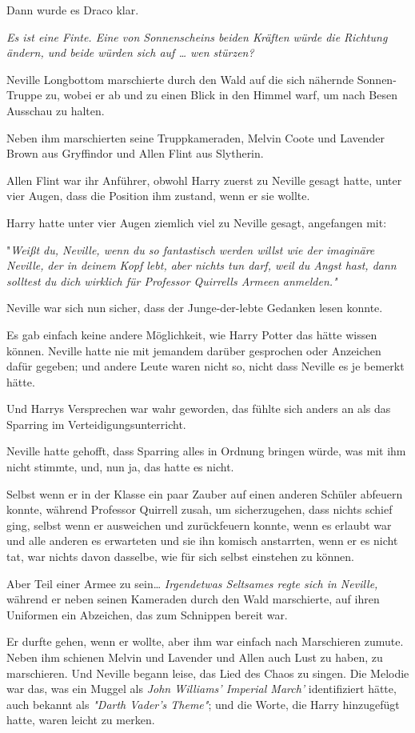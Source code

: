{Dann wurde es Draco klar.

\emph{Es ist eine Finte. Eine von Sonnenscheins beiden Kräften würde die Richtung ändern, und beide würden sich auf … wen stürzen?}

Neville Longbottom marschierte durch den Wald auf die sich nähernde Sonnen-Truppe zu, wobei er ab und zu einen Blick in den Himmel warf, um nach Besen Ausschau zu halten.

Neben ihm marschierten seine Truppkameraden, Melvin Coote und Lavender Brown aus Gryffindor und Allen Flint aus Slytherin.

Allen Flint war ihr Anführer, obwohl Harry zuerst zu Neville gesagt hatte, unter vier Augen, dass die Position ihm zustand, wenn er sie wollte.

Harry hatte unter vier Augen ziemlich viel zu Neville gesagt, angefangen mit:

"\emph{Weißt du, Neville, wenn du so fantastisch werden willst wie der imaginäre Neville,} \emph{der in deinem Kopf lebt, aber nichts tun darf, weil du Angst hast, dann solltest du dich wirklich für Professor Quirrells Armeen anmelden."}

Neville war sich nun sicher, dass der Junge-der-lebte Gedanken lesen konnte.

Es gab einfach keine andere Möglichkeit, wie Harry Potter das hätte wissen können. Neville hatte nie mit jemandem darüber gesprochen oder Anzeichen dafür gegeben; und andere Leute waren nicht so, nicht dass Neville es je bemerkt hätte.

Und Harrys Versprechen war wahr geworden, das fühlte sich anders an als das Sparring im Verteidigungsunterricht.

Neville hatte gehofft, dass Sparring alles in Ordnung bringen würde, was mit ihm nicht stimmte, und, nun ja, das hatte es nicht.

Selbst wenn er in der Klasse ein paar Zauber auf einen anderen Schüler abfeuern konnte, während Professor Quirrell zusah, um sicherzugehen, dass nichts schief ging, selbst wenn er ausweichen und zurückfeuern konnte, wenn es erlaubt war und alle anderen es erwarteten und sie ihn komisch anstarrten, wenn er es nicht tat, war nichts davon dasselbe, wie für sich selbst einstehen zu können.

Aber Teil einer Armee zu sein… \emph{Irgendetwas Seltsames regte sich in Neville,} während er neben seinen Kameraden durch den Wald marschierte, auf ihren Uniformen ein Abzeichen, das zum Schnippen bereit war.

Er durfte gehen, wenn er wollte, aber ihm war einfach nach Marschieren zumute. Neben ihm schienen Melvin und Lavender und Allen auch Lust zu haben, zu marschieren. Und Neville begann leise, das Lied des Chaos zu singen. Die Melodie war das, was ein Muggel als \emph{John Williams' Imperial March'} identifiziert hätte, auch bekannt als \emph{"Darth Vader's Theme"}; und die Worte, die Harry hinzugefügt hatte, waren leicht zu merken.

}
